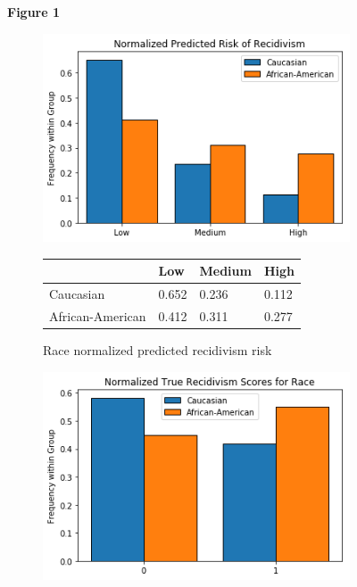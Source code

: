 \documentclass[11pt, fleqn, titlepage]{article}
\begin{document}
	\begin{figure}[H]
		\centering
		\textbf{\textbf{Figure 1}}\par\medskip
		\begin{subfigure}{0.5\textwidth}
			\centering
			\includegraphics[width=0.9\linewidth]{"imgs/normalized_recid_race"}
			\begin{table}[H]
				\centering
				\begin{tabular}{|l|l|l|l|}
					\hline
					& Low   & Medium & High  \\ \hline
					Caucasian        & 0.652 & 0.236  & 0.112 \\ \hline
					African-American & 0.412 & 0.311  & 0.277 \\ \hline
				\end{tabular}
			\end{table}
			\caption{Race normalized predicted recidivism risk}\label{fig:predictedrecidrace}
		\end{subfigure}%
		\begin{subfigure}{0.5\textwidth}
			\centering
			\includegraphics[width=0.9\linewidth]{"imgs/true_normalized_race"}

\end{subfigure}
\end{figure}
\end{document}
